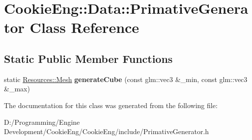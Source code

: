 \hypertarget{class_cookie_eng_1_1_data_1_1_primative_generator}{}\section{Cookie\+Eng\+:\+:Data\+:\+:Primative\+Generator Class Reference}
\label{class_cookie_eng_1_1_data_1_1_primative_generator}
\subsection*{Static Public Member Functions}
\begin{DoxyCompactItemize}
\item 
\mbox{\label{class_cookie_eng_1_1_data_1_1_primative_generator_adc4d4afd05a9478974994f71546cc9d5}} 
static \hyperlink{struct_cookie_eng_1_1_resources_1_1_mesh}{Resources\+::\+Mesh} {\bfseries generate\+Cube} (const glm\+::vec3 \&\+\_\+min, const glm\+::vec3 \&\+\_\+max)
\end{DoxyCompactItemize}


The documentation for this class was generated from the following file\+:\begin{DoxyCompactItemize}
\item 
D\+:/\+Programming/\+Engine Development/\+Cookie\+Eng/\+Cookie\+Eng/include/Primative\+Generator.\+h\end{DoxyCompactItemize}
